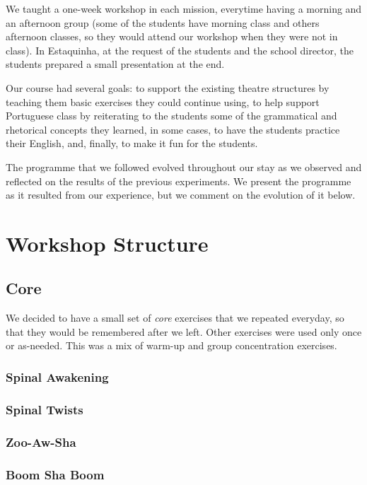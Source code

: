 \documentclass[article,twocolumn,twoside]{memoir}
\begin{document}
We taught a one-week workshop in each mission, everytime having a morning and
an afternoon group (some of the students have morning class and others
afternoon classes, so they would attend our workshop when they were not in
class). In Estaquinha, at the request of the students and the school director,
the students prepared a small presentation at the end.

Our course had several goals: to support the existing theatre structures by
teaching them basic exercises they could continue using, to help support
Portuguese class by reiterating to the students some of the grammatical and
rhetorical concepts they learned, in some cases, to have the students practice
their English, and, finally, to make it fun for the students.

The programme that we followed evolved throughout our stay as we observed and
reflected on the results of the previous experiments. We present the programme
as it resulted from our experience, but we comment on the evolution of it
below.

\chapter{Workshop Structure}

\section{Core}

We decided to have a small set of \textit{core} exercises that we repeated
everyday, so that they would be remembered after we left. Other exercises were
used only once or as-needed. This was a mix of warm-up and group concentration
exercises.

\subsection{Spinal Awakening}
\subsection{Spinal Twists}
\subsection{Zoo-Aw-Sha}
\subsection{Boom Sha Boom}
\end{document}
